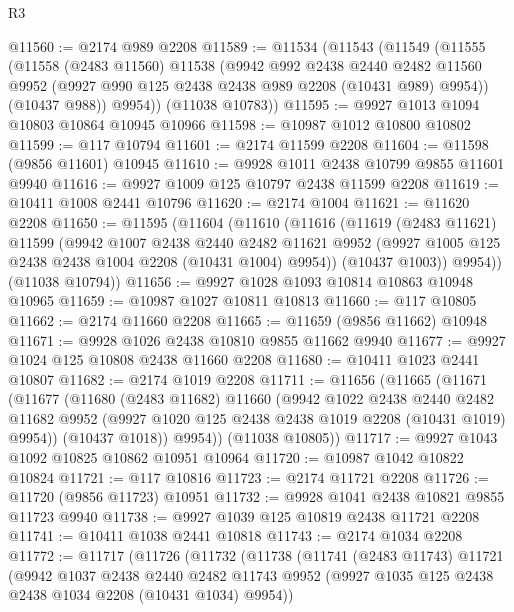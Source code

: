 \begin{lexlean}{R3}
\begin{coremodule}
@11560 := @2174 @989 @2208
@11589 := @11534
    (@11543
      (@11549
        (@11555
          (@11558
            (@2483 @11560)
            @11538
            (@9942
              @992
              @2438
              @2440
              @2482
              @11560
              @9952
              (@9927 @990 @125 @2438 @2438 @989 @2208 (@10431 @989) @9954))
            (@10437 @988))
          @9954))
      (@11038 @10783))
@11595 := @9927 @1013 @1094 @10803 @10864 @10945 @10966
@11598 := @10987 @1012 @10800 @10802
@11599 := @117 @10794
@11601 := @2174 @11599 @2208
@11604 := @11598 (@9856 @11601) @10945
@11610 := @9928 @1011 @2438 @10799 @9855 @11601 @9940
@11616 := @9927 @1009 @125 @10797 @2438 @11599 @2208
@11619 := @10411 @1008 @2441 @10796
@11620 := @2174 @1004
@11621 := @11620 @2208
@11650 := @11595
    (@11604
      (@11610
        (@11616
          (@11619
            (@2483 @11621)
            @11599
            (@9942
              @1007
              @2438
              @2440
              @2482
              @11621
              @9952
              (@9927 @1005 @125 @2438 @2438 @1004 @2208 (@10431 @1004) @9954))
            (@10437 @1003))
          @9954))
      (@11038 @10794))
@11656 := @9927 @1028 @1093 @10814 @10863 @10948 @10965
@11659 := @10987 @1027 @10811 @10813
@11660 := @117 @10805
@11662 := @2174 @11660 @2208
@11665 := @11659 (@9856 @11662) @10948
@11671 := @9928 @1026 @2438 @10810 @9855 @11662 @9940
@11677 := @9927 @1024 @125 @10808 @2438 @11660 @2208
@11680 := @10411 @1023 @2441 @10807
@11682 := @2174 @1019 @2208
@11711 := @11656
    (@11665
      (@11671
        (@11677
          (@11680
            (@2483 @11682)
            @11660
            (@9942
              @1022
              @2438
              @2440
              @2482
              @11682
              @9952
              (@9927 @1020 @125 @2438 @2438 @1019 @2208 (@10431 @1019) @9954))
            (@10437 @1018))
          @9954))
      (@11038 @10805))
@11717 := @9927 @1043 @1092 @10825 @10862 @10951 @10964
@11720 := @10987 @1042 @10822 @10824
@11721 := @117 @10816
@11723 := @2174 @11721 @2208
@11726 := @11720 (@9856 @11723) @10951
@11732 := @9928 @1041 @2438 @10821 @9855 @11723 @9940
@11738 := @9927 @1039 @125 @10819 @2438 @11721 @2208
@11741 := @10411 @1038 @2441 @10818
@11743 := @2174 @1034 @2208
@11772 := @11717
    (@11726
      (@11732
        (@11738
          (@11741
            (@2483 @11743)
            @11721
            (@9942
              @1037
              @2438
              @2440
              @2482
              @11743
              @9952
              (@9927 @1035 @125 @2438 @2438 @1034 @2208 (@10431 @1034) @9954))

\end{coremodule}
\end{lexlean}
